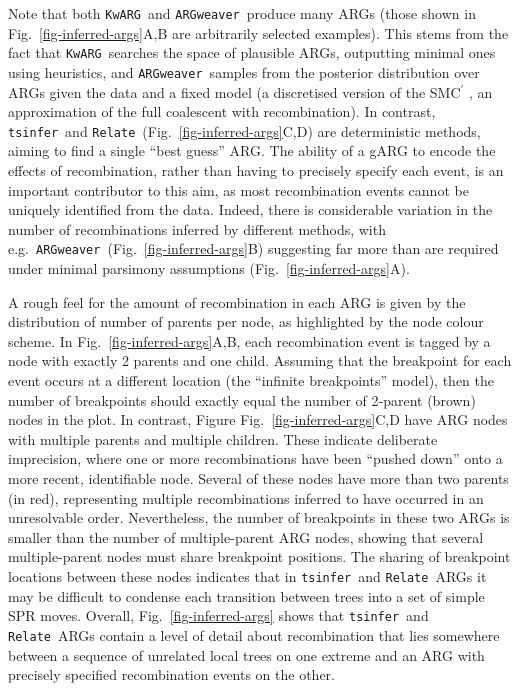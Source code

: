 \documentclass{article}
\newcommand{\tsinfer}[0]{\texttt{tsinfer}}
\newcommand{\kwarg}[0]{\texttt{KwARG}}
\newcommand{\argweaver}[0]{\texttt{ARGweaver}}
\newcommand{\relate}[0]{\texttt{Relate}}
\begin{document}
Note that both \kwarg\ and \argweaver\ produce many ARGs
(those shown in Fig.~\ref{fig-inferred-args}A,B are arbitrarily selected examples).
This stems from the fact that \kwarg\ searches the space of plausible ARGs,
outputting minimal ones using heuristics, and \argweaver\ samples
from the posterior distribution over
ARGs given the data and a fixed model (a discretised version of the SMC$^\prime$ \citep{marjoram2006fast},
an approximation of the full coalescent with recombination).
In contrast, \tsinfer\ and \relate\ (Fig.~\ref{fig-inferred-args}C,D) are
deterministic methods, aiming to find a single ``best guess'' ARG.
The ability of a gARG to encode the effects of recombination, rather
than having to precisely specify each event, is an important contributor to this aim,
as most recombination events cannot be uniquely identified from the data.
Indeed, there is considerable variation in the number of recombinations inferred by
different methods, with e.g.~\argweaver\ (Fig.~\ref{fig-inferred-args}B) suggesting
far more than are required under minimal parsimony assumptions (Fig.~\ref{fig-inferred-args}A).

A rough feel for the amount of recombination in each ARG is given by the distribution
of number of parents per node, as highlighted by the node colour scheme.
In Fig.~\ref{fig-inferred-args}A,B, each recombination event is tagged by
a node with exactly 2 parents and one child. Assuming that the breakpoint for each event
occurs at a different location (the ``infinite breakpoints'' model), then the
number of breakpoints should exactly equal the number of 2-parent (brown) nodes in the plot.
In contrast, Figure Fig.~\ref{fig-inferred-args}C,D have ARG nodes with multiple
parents and multiple children. These indicate deliberate imprecision, where one
or more recombinations have been ``pushed down'' onto a more recent, identifiable node.
Several of these nodes have more than two parents (in red), representing
multiple recombinations inferred to have occurred in an unresolvable order.
Nevertheless, the number of breakpoints in these two ARGs is smaller than the
number of multiple-parent ARG nodes, showing that several multiple-parent nodes
must share breakpoint positions. The sharing of breakpoint locations
between these nodes indicates that in \tsinfer\ and \relate\ ARGs it may be
difficult to condense each transition between trees into a set of simple SPR moves.
Overall, Fig.~\ref{fig-inferred-args} shows that \tsinfer\ and \relate\ ARGs contain a level
of detail about recombination that lies somewhere between a sequence of unrelated local
trees on one extreme and an ARG with precisely specified recombination events on the other.
\end{document}
